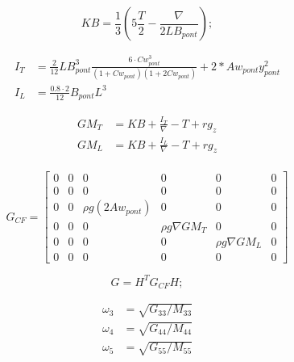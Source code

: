 \documentclass[12pt,a4]{article}
\begin{document}
\begin{equation}
	KB = \frac{1}{3}(5\frac{T}{2} - \frac{\nabla}{2 L B_{pont}});
\end{equation}

\begin{align}
	I_T & = \frac{2}{12} L B_{pont}^3 \frac{6\cdot Cw_{pont}^3}{(1+Cw_{pont})(1+2Cw_{pont})} + 2 * Aw_{pont} y_{pont}^2 \\
	I_L & = \frac{0.8\cdot 2}{12}  B_{pont}  L^3
\end{align}

\begin{align}
	GM_T & = KB + \frac{I_T}{\nabla} - T + rg_z  \\
	GM_L & = KB + \frac{I_L}{\nabla}  - T + rg_z \\
\end{align}


\begin{equation}
	G_{CF} = \begin{bmatrix}
		0 & 0 & 0                       & 0                    & 0                   & 0 \\
		0 & 0 & 0                       & 0                    & 0                   & 0 \\
		0 & 0 & \rho  g  (2  Aw_{pont}) & 0                    & 0                   & 0 \\
		0 & 0 & 0                       & \rho  g \nabla  GM_T & 0                   & 0 \\
		0 & 0 & 0                       & 0                    & \rho  g \nabla GM_L & 0 \\
		0 & 0 & 0                       & 0                    & 0                   & 0
	\end{bmatrix}
\end{equation}




\begin{equation}
	G = H^T  G_{CF}  H;
\end{equation}

\begin{align}
	\omega_3 & = \sqrt{G_{33}/M_{33}} \\
	\omega_4 & = \sqrt{G_{44}/M_{44}} \\
	\omega_5 & = \sqrt{G_{55}/M_{55}}
\end{align}
\end{document}
